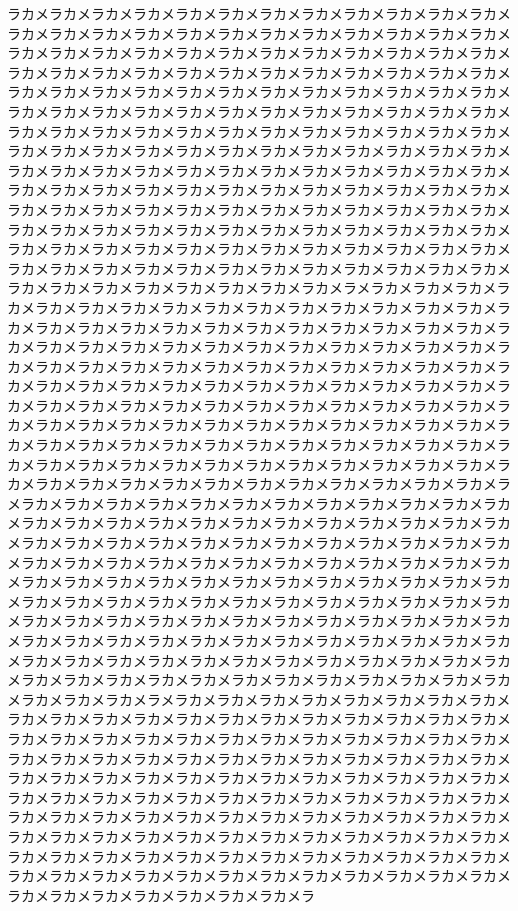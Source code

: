 \documentclass[11pt, a4paper]{jsarticle}
\numberwithin{equation}{section}
\begin{document}
ラカメラカメラカメラカメラカメラカメラカメラカメラカメラカメラカメラカメラカメラカメラカメラカメラカメラカメラカメラカメラカメラカメラカメラカメラカメラカメラカメラカメラカメラカメラカメラカメラカメラカメラカメラカメラカメラカメラカメラカメラカメラカメラカメラカメラカメラカメラカメラカメラカメラカメラカメラカメラカメラカメラカメラカメラカメラカメラカメラカメラカメラカメラカメラカメラカメラカメラカメラカメラカメラカメラカメラカメラカメラカメラカメラカメラカメラカメラカメラカメラカメラカメラカメラカメラカメラカメラカメラカメラカメラカメラカメラカメラカメラカメラカメラカメラカメラカメラカメラカメラカメラカメラカメラカメラカメラカメラカメラカメラカメラカメラカメラカメラカメラカメラカメラカメラカメラカメラカメラカメラカメラカメラカメラカメラカメラカメラカメラカメラカメラカメラカメラカメラカメラカメラカメラカメラカメラカメラカメラカメラカメラカメラカメラカメラカメラカメラカメラカメラカメラカメラカメラカメラカメラカメラカメラカメラカメラカメラカメラカメラカメラカメラカメラカメラカメラカメラカメラカメラカメラカメラカメラカメラカメラカメラカメラカメラメラカメラカメラカメラカメラカメラカメラカメラカメラカメラカメラカメラカメラカメラカメラカメラカメラカメラカメラカメラカメラカメラカメラカメラカメラカメラカメラカメラカメラカメラカメラカメラカメラカメラカメラカメラカメラカメラカメラカメラカメラカメラカメラカメラカメラカメラカメラカメラカメラカメラカメラカメラカメラカメラカメラカメラカメラカメラカメラカメラカメラカメラカメラカメラカメラカメラカメラカメラカメラカメラカメラカメラカメラカメラカメラカメラカメラカメラカメラカメラカメラカメラカメラカメラカメラカメラカメラカメラカメラカメラカメラカメラカメラカメラカメラカメラカメラカメラカメラカメラカメラカメラカメラカメラカメラカメラカメラカメラカメラカメラカメラカメラカメラカメラカメラカメラカメラカメラカメラカメラカメラカメラカメラカメラメラカメラカメラカメラカメラカメラカメラカメラカメラカメラカメラカメラカメラカメラカメラカメラカメラカメラカメラカメラカメラカメラカメラカメラカメラカメラカメラカメラカメラカメラカメラカメラカメラカメラカメラカメラカメラカメラカメラカメラカメラカメラカメラカメラカメラカメラカメラカメラカメラカメラカメラカメラカメラカメラカメラカメラカメラカメラカメラカメラカメラカメラカメラカメラカメラカメラカメラカメラカメラカメラカメラカメラカメラカメラカメラカメラカメラカメラカメラカメラカメラカメラカメラカメラカメラカメラカメラカメラカメラカメラカメラカメラカメラカメラカメラカメラカメラカメラカメラカメラカメラカメラカメラカメラカメラカメラカメラカメラカメラカメラカメラカメラカメラカメラカメラカメラカメラカメラカメラカメラカメラカメラカメラカメラメラカメラカメラカメラカメラカメラカメラカメラカメラカメラカメラカメラカメラカメラカメラカメラカメラカメラカメラカメラカメラカメラカメラカメラカメラカメラカメラカメラカメラカメラカメラカメラカメラカメラカメラカメラカメラカメラカメラカメラカメラカメラカメラカメラカメラカメラカメラカメラカメラカメラカメラカメラカメラカメラカメラカメラカメラカメラカメラカメラカメラカメラカメラカメラカメラカメラカメラカメラカメラカメラカメラカメラカメラカメラカメラカメラカメラカメラカメラカメラカメラカメラカメラカメラカメラカメラカメラカメラカメラカメラカメラカメラカメラカメラカメラカメラカメラカメラカメラカメラカメラカメラカメラカメラカメラカメラカメラカメラカメラカメラカメラカメラカメラカメラカメラカメラカメラカメラカメラカメラカメラカメラカメラカメラ
\end{document}
